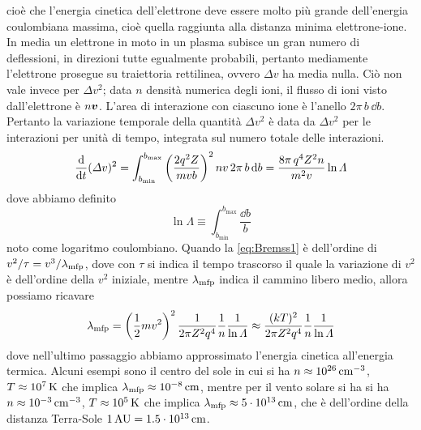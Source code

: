 cioè che l'energia cinetica dell'elettrone deve essere molto più grande dell'energia coulombiana massima, cioè quella raggiunta alla distanza minima elettrone-ione.
In media un elettrone in moto in un plasma subisce un gran numero di deflessioni, in direzioni tutte egualmente probabili, pertanto mediamente l'elettrone prosegue su traiettoria rettilinea, ovvero $\Delta v$ ha media nulla. Ciò non vale invece per $\Delta v^2$; data $n$ densità numerica degli ioni, il flusso di ioni visto dall'elettrone è $n\V{v}$. L'area di interazione con ciascuno ione è l'anello $2\pi\,b\,\dd b$. Pertanto la variazione temporale della quantità $\Delta v^2$ è data da $\Delta v^2$ per le interazioni per unità di tempo, integrata sul numero totale delle interazioni.
\begin{equation}
\dfrac{\mathrm{d} {}}{\mathrm{d} {t}}(\Delta v)^2 = \int_{b_\mathrm{min}}^{b_\mathrm{max}} \left( \dfrac{2 q^2 Z}{m v b} \right)^2 nv\, 2\pi\,b\,\mathrm{d} b = \dfrac{8\pi \,q^4 Z^2 n}{m^2 v} \ln \Lambda \label{eq:Bremss1}
\end{equation}
dove abbiamo definito 
\begin{equation}
\ln \Lambda \equiv \int_{b_\mathrm{min}}^{b_\mathrm{max}} \dfrac{\dd b}{b}
\end{equation}
noto come logaritmo coulombiano. Quando la \ref{eq:Bremss1} è dell'ordine di $v^2/\tau = v^3/ \lambda_\mathrm{mfp}$, dove con $\tau$ si indica il tempo trascorso il quale la variazione di $v^2$ è dell'ordine della $v^2$ iniziale, mentre $\lambda_\mathrm{mfp}$ indica il cammino libero medio, allora possiamo ricavare 
\begin{equation}
\lambda_\mathrm{mfp} =\left(\dfrac{1}{2}mv^2\right)^2 \dfrac{1}{2\pi Z^2 q^4} \dfrac{1}{n} \dfrac{1}{\ln \Lambda} \approx \dfrac{(kT)^2}{2\pi Z^2 q^4} \dfrac{1}{n} \dfrac{1}{\ln \Lambda}
\end{equation}
dove nell'ultimo passaggio abbiamo approssimato l'energia cinetica all'energia termica.
Alcuni esempi sono il centro del sole in cui si ha $n\approx10^{26}\,\mathrm{c m}^{-3}$, $T\approx 10^7\,\mathrm{ K}$ che implica $\lambda_\mathrm{mfp} \approx 10^{-8}\,\mathrm{c m}$, mentre per il vento solare si ha si ha $n\approx10^{-3}\,\mathrm{c m}^{-3}$, $T\approx 10^5\,\mathrm{ K}$ che implica $\lambda_\mathrm{mfp} \approx 5\cdot 10^{13}\,\mathrm{c m}$, che è dell'ordine della distanza Terra-Sole $1 \,\mathrm{ AU} = 1.5\cdot 10^{13}\,\mathrm{c m}$.

